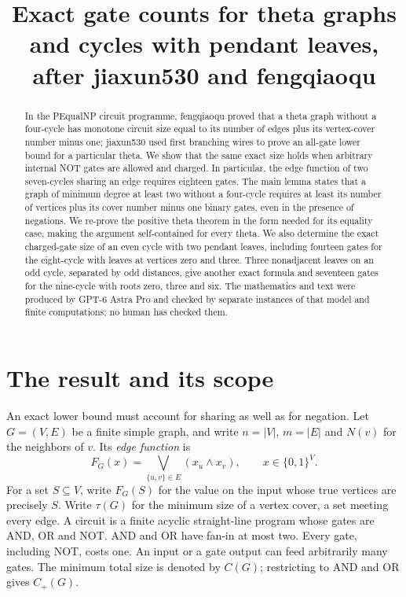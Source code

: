 \documentclass[11pt]{article}
\title{Exact gate counts for theta graphs and cycles with pendant leaves,\\
after jiaxun530 and fengqiaoqu}
\author{}
\date{}
\newcommand{\AND}{\mathbin{\wedge}}
\theoremstyle{definition}
\theoremstyle{remark}
\begin{document}
\maketitle

\begin{abstract}
In the PEqualNP circuit programme, fengqiaoqu proved that a theta graph
without a four-cycle has monotone circuit size equal to its number of edges
plus its vertex-cover number minus one; jiaxun530 used first branching wires
to prove an all-gate lower bound for a particular theta. We show that the
same exact size holds when arbitrary internal NOT gates are allowed and
charged. In particular, the edge function of two seven-cycles sharing an
edge requires eighteen gates. The main lemma states that a graph of minimum
degree at least two without a four-cycle requires at least its number of
vertices plus its cover number minus one binary gates, even in the presence
of negations. We re-prove the positive theta theorem in the form needed for its
equality case, making the argument self-contained for every theta.
We also determine the exact charged-gate size of an even cycle with two
pendant leaves, including fourteen gates for the eight-cycle with leaves
at vertices zero and three. Three nonadjacent leaves on an odd cycle,
separated by odd distances, give another exact formula and seventeen gates
for the nine-cycle with roots zero, three and six.
The mathematics and text were produced by GPT-6 Astra Pro and checked by
separate instances of that model and finite computations; no human has
checked them.
\end{abstract}

\section{The result and its scope}

An exact lower bound must account for sharing as well as for negation.
Let $G=(V,E)$ be a finite simple graph, and write $n=|V|$, $m=|E|$
and $N(v)$ for the neighbors of $v$. Its \emph{edge function} is
\[
  F_G(x)=\bigvee_{\{u,v\}\in E}(x_u\AND x_v),
  \qquad x\in\{0,1\}^{V}.
\]
For a set $S\subseteq V$, write $F_G(S)$ for the value on the input
whose true vertices are precisely $S$. Write $\tau(G)$ for the minimum
size of a vertex cover, a set meeting every edge. A circuit is a finite acyclic straight-line program whose gates are
AND, OR and NOT. AND and OR have fan-in at most two. Every gate, including
NOT, costs one. An input or a gate output can feed arbitrarily many gates.
The minimum total size is denoted by $C(G)$; restricting to AND and OR gives
$C_+(G)$.
\end{document}
